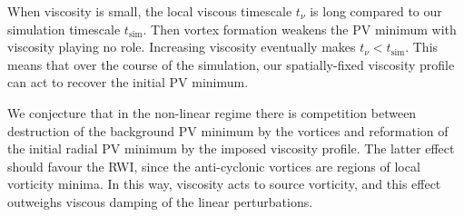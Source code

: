 When viscosity is small, the local viscous timescale $t_\nu$ is long compared to our
simulation timescale $t_\mathrm{sim}$. Then vortex formation weakens the PV minimum
with viscosity playing no role. Increasing viscosity eventually makes 
$t_\nu<t_\mathrm{sim}$. This means that over the course of the
simulation, our spatially-fixed viscosity profile can act to recover the
initial PV minimum.  

We conjecture that in the non-linear regime there is competition 
between destruction of the background PV minimum by the 
vortices and reformation of the initial radial PV minimum by the
imposed viscosity profile. The latter effect should favour the RWI,
since the anti-cyclonic vortices are regions of local vorticity
minima. In this way, viscosity acts to source vorticity, and this
effect outweighs viscous damping of the linear perturbations.    

